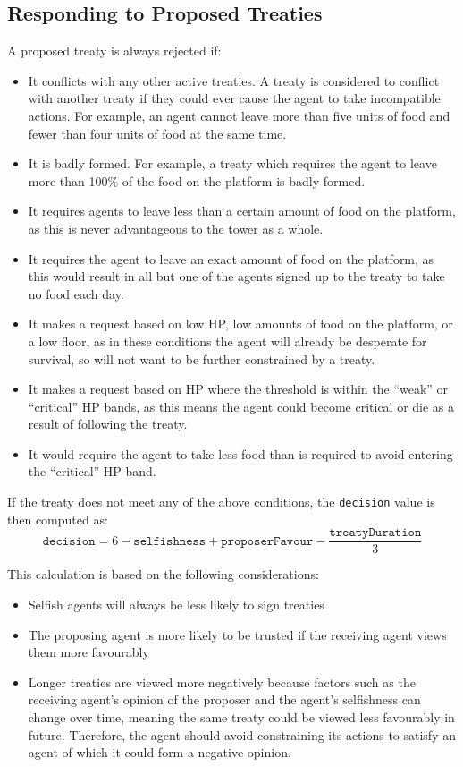 \subsection*{Responding to Proposed Treaties}\label{sec:team5-treaties-response}
A proposed treaty is always rejected if:
\begin{itemize}
    \item It conflicts with any other active treaties. A treaty is considered to conflict with another treaty if they could ever cause the agent to take incompatible actions. For example, an agent cannot leave more than five units of food and fewer than four units of food at the same time.
    \item It is badly formed. For example, a treaty which requires the agent to leave more than 100\% of the food on the platform is badly formed.
    \item It requires agents to leave less than a certain amount of food on the platform, as this is never advantageous to the tower as a whole.
    \item It requires the agent to leave an exact amount of food on the platform, as this would result in all but one of the agents signed up to the treaty to take no food each day.
    \item It makes a request based on low HP, low amounts of food on the platform, or a low floor, as in these conditions the agent will already be desperate for survival, so will not want to be further constrained by a treaty.
    \item It makes a request based on HP where the threshold is within the ``weak'' or ``critical'' HP bands, as this means the agent could become critical or die as a result of following the treaty.
    \item It would require the agent to take less food than is required to avoid entering the ``critical'' HP band.
\end{itemize}
If the treaty does not meet any of the above conditions, the \texttt{decision} value is then computed as:
\[\texttt{decision} = 6 - \texttt{selfishness} + \texttt{proposerFavour} - \frac{\texttt{treatyDuration}}{3}\]

This calculation is based on the following considerations:
\begin{itemize}
    \item Selfish agents will always be less likely to sign treaties
    \item The proposing agent is more likely to be trusted if the receiving agent views them more favourably
    \item Longer treaties are viewed more negatively because factors such as the receiving agent's opinion of the proposer and the agent's selfishness can change over time, meaning the same treaty could be viewed less favourably in future. Therefore, the agent should avoid constraining its actions to satisfy an agent of which it could form a negative opinion.
\end{itemize}

